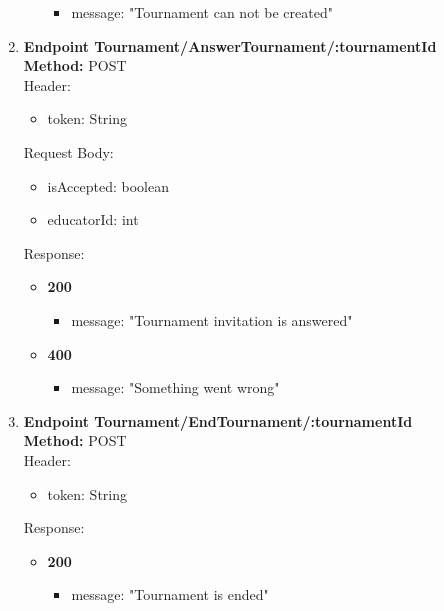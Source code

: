 \begin{enumerate}
\begin{itemize}
\begin{itemize}
            \item message: "Tournament can not be created"
        \end{itemize}
    \end{itemize}
    \item \textbf{Endpoint Tournament/AnswerTournament/:tournamentId} \\
    \textbf{Method:} POST \\
    Header:\\
    \begin{itemize}
        \item token: String
    \end{itemize}
    Request Body:\\
    \begin{itemize}
        \item isAccepted: boolean
        \item educatorId: int
    \end{itemize}
    Response:\\
    \begin{itemize}
        \item \textbf{200} \\
        \begin{itemize}
            \item message: "Tournament invitation is answered"
        \end{itemize}
        \item \textbf{400} \\
        \begin{itemize}
            \item message: "Something went wrong"
        \end{itemize}
    \end{itemize}
    \item \textbf{Endpoint Tournament/EndTournament/:tournamentId} \\
    \textbf{Method:} POST \\
    Header:\\
    \begin{itemize}
        \item token: String
    \end{itemize}
    Response:\\
    \begin{itemize}
        \item \textbf{200} \\
        \begin{itemize}
            \item message: "Tournament is ended"

\end{itemize}
\end{itemize}
\end{enumerate}
